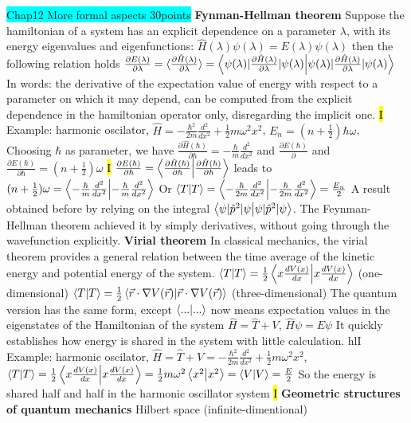 \documentclass[fontsize=4pt]{scrartcl}
\begin{document}
\colorbox{Cyan}{Chap12 More formal aspects 30points}
\textbf{Fynman-Hellman theorem}
 Suppose the hamiltonian of a system has an explicit dependence on a parameter $\lambda$, with its energy eigenvalues and eigenfunctions: $\hat{H}(\lambda)\psi (\lambda) = E (\lambda)\psi(\lambda)$ then the following relation holds
$\frac{\partial E(\lambda)}{\partial \lambda} = \langle \frac{\partial \hat{H}(\lambda)}{\partial \lambda} \rangle = \braket { \psi (\lambda) | \frac{\partial \hat{H} (\lambda) }{ \partial \lambda} | \psi (\lambda) } $ In words: the derivative of the expectation value of energy with respect to a parameter on which it may depend, can be computed from the explicit dependence in the hamiltonian operator only, disregarding the implicit one. 
\hl{I}
Example: harmonic oscilator, $\hat{H} = -\frac{\hbar^2}{2m}\frac{d^2}{dx^2} + \frac{1}{2}m\omega^2x^2$, $E_n = (n + \frac{1}{2})\hbar \omega$,  Choosing $\hbar$ as parameter, we have $\frac{\partial \hat{H}(\hbar)}{\partial \hbar} = -\frac{\hbar}{m}\frac{d^2}{dx^2}$ and $\frac{\partial E(\hbar)}{\partial}$ and $\frac{\partial E(\hbar)}{\partial \hbar} =  (n+\frac{1}{2})\omega$ 
\hl{I}
$\frac{\partial E(\hbar)}{\partial \hbar} = \braket{\frac{\partial \hat{H}(\hbar)}{\partial \hbar}}$ leads to $(n+\frac{1}{2})\omega = \braket{- \frac{\hbar}{m}\frac{d^2}{dx^2}}$ Or $\braket{T} = \braket{- \frac{\hbar}{2m}\frac{d^2}{dx^2}} = \frac{E_n}{2}$
A result obtained before by relying on the integral $\braket{\psi | \hat{p}^2 | \psi}$. The Feynman-Hellman theorem achieved it by simply derivatives, without going through the wavefunction explicitly.
\textbf{Virial theorem}
In classical mechanics, the virial theorem provides a general relation between the time average of the kinetic energy and potential energy of the system. $\braket{T} = \frac{1}{2}\braket{x\frac{dV(x)}{dx}}$ (one-dimensional) $\braket{T} = \frac{1}{2}\braket{\vec{r} \cdot \nabla V(\vec{r})}$ (three-dimensional) The quantum version has the same form, except $\braket{...}$ now means expectation values in the eigenstates of the Hamiltonian of the system $\hat{H} = \hat{T} + V$, $\hat{H}\psi = E\psi$
It quickly establishes how energy is shared in the system with little calculation. 
hl{I}
Example: harmonic oscilator, $\hat{H} = \hat{T} + V = -\frac{\hbar^2}{2m}\frac{d^2}{dx^2} + \frac{1}{2}m\omega^2 x^2$, $\braket{T} = \frac{1}{2}\braket{x\frac{dV(x)}{dx}} = \frac{1}{2} m\omega^2 \braket{x^2} = \braket{V} = \frac{E}{2}$ So the energy is shared half and half in the harmonic oscillator system
\hl{I}
\textbf{Geometric structures of quantum mechanics} Hilbert space (infinite-dimentional)
\end{document}
